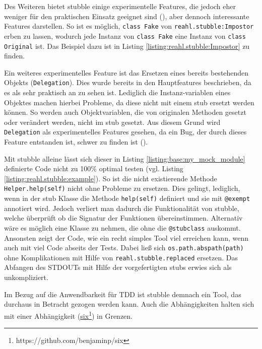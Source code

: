 Des Weiteren bietet stubble einige experimentelle Features, die jedoch eher
weniger für den praktischen Einsatz geeignet sind (\cite{reahl.stubble:4.0}),
aber dennoch interessante Features darstellen. So ist es möglich,
\lstinline{class Fake} von \lstinline{reahl.stubble:Impostor} erben zu lassen,
wodurch jede Instanz von \lstinline{class Fake} eine Instanz von
\lstinline{class Original} ist. Das Beispiel dazu ist in Listing
\ref{listing:reahl.stubble:Impostor} zu finden.

Ein weiteres experimentelles Feature ist das Ersetzen eines bereits bestehenden
Objekts (\lstinline{Delegation}). Dies wurde bereits in den Hauptfeatures
beschrieben, da es als sehr praktisch an zu sehen ist. Lediglich die
Instanz-variablen eines Objektes machen hierbei Probleme, da diese nicht mit
einem \Gls{stub} ersetzt werden können. So werden auch Objektvariablen, die von
originalen Methoden gesetzt oder verändert werden, nicht im \Gls{stub} gesetzt.
Aus diesem Grund wird \lstinline{Delegation} als experimentelles Features
gesehen, da ein Bug, der durch dieses Feature entstanden ist, schwer zu finden
ist (\cite{reahl.stubble:4.0}).

Mit stubble alleine lässt sich dieser in Listing 
\ref{listing:base:my_mock_module} definierte Code nicht zu 100\% optimal testen
(vgl. Listing \ref{listing:reahl.stubble:example}). So ist die nicht
existierende Methode \lstinline{Helper.help(self)} nicht ohne Probleme zu
ersetzen. Dies gelingt, lediglich, wenn in der \Gls{stub} Klasse die Methode
\lstinline{help(self)} definiert und sie mit \lstinline{@exempt} annotiert
wird. Jedoch verliert man dadurch die Funktionalität von stubble, welche
überprüft ob die Signatur der Funktionen übereinstimmen. Alternativ wäre es
möglich eine Klasse zu nehmen, die ohne die \lstinline{@stubclass} auskommt.
Ansonsten zeigt der Code, wie ein recht simples Tool viel erreichen kann, wenn
auch mit viel Code abseits der Tests. Dabei ließ sich
\lstinline{os.path.abspath(path)} ohne Komplikationen mit Hilfe von
\lstinline{reahl.stubble.replaced} ersetzen. Das Abfangen des STDOUTs mit Hilfe
der vorgefertigten \Glspl{stub} erwies sich als unkompliziert.
\newline

Im Bezug auf die Anwendbarkeit für TDD ist stubble demnach ein Tool, das
durchaus in Betracht gezogen werden kann. Auch die Abhängigkeiten halten sich
mit einer Abhängigkeit
(\href{https://github.com/benjaminp/six}{six}\footnote{https://github.com/benjaminp/six})
in Grenzen.

